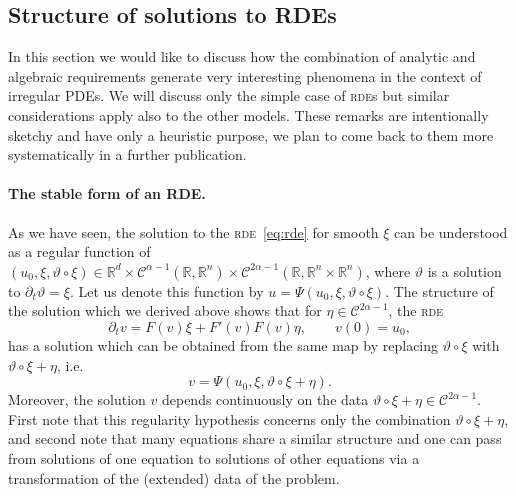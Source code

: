 \documentclass[11pt,a4paper]{article}
\theoremstyle{remark}
\newcommand{\R}{\mathbb{R}}
\newcommand{\CC}{\ensuremath{\mathscr{C}}}
\begin{document}
\subsection{Structure of solutions to RDEs}

In this section we would like to discuss how the combination of analytic and algebraic requirements generate very interesting phenomena in the context of irregular PDEs. We will discuss only the simple case of \textsc{rde}s but similar considerations apply also to the other models. These remarks are intentionally sketchy and have only a heuristic purpose, we plan to come back to them more systematically in a further publication.

\paragraph{The stable form of an RDE.}
As we have seen, the solution to the \textsc{rde}~{\eqref{eq:rde}} for smooth $\xi$ can
be understood as a regular function of $(u_0, \xi , \vartheta \circ   \xi ) \in \R^d \times \CC^{\alpha -1} ( \mathbb{R},\mathbb{R}^{n} ) \times \CC^{2 \alpha -1} (\mathbb{R},\mathbb{R}^{n} \times \mathbb{R}^{n} )$, where $\vartheta$ is a
solution to $\partial_{t} \vartheta = \xi$. Let us denote this function by $u=\Psi ( u_{0} , \xi , \vartheta \circ   \xi )$. The structure of the solution
which we derived above shows that for $\eta \in \CC^{2 \alpha -1}$, the \textsc{rde}
\begin{equation}\label{eq:rde-ren}
  \partial_{t} v=F ( v ) \xi +F' ( v ) F ( v ) \eta, \qquad v(0) = u_0,
\end{equation}
has a solution which can be obtained from the same map by replacing $\vartheta \circ   \xi$ with $\vartheta \circ   \xi + \eta$, i.e.
\[
   v= \Psi ( u_{0} , \xi , \vartheta \circ   \xi + \eta ).
\]
Moreover, the solution $v$ depends continuously on the data $\vartheta \circ \xi + \eta \in \CC^{2 \alpha -1}$. First note that this regularity hypothesis
concerns only the combination $\vartheta \circ   \xi + \eta$, and second note
that many equations share a similar structure and one can pass from solutions
of one equation to solutions of other equations via a transformation of the
(extended) data of the problem.
\end{document}
